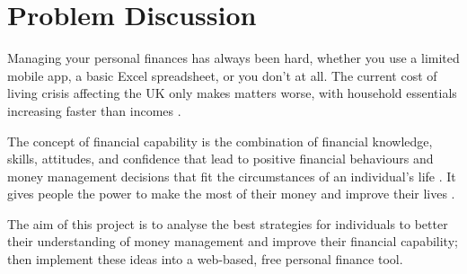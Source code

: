 \section{Problem Discussion}
Managing your personal finances has always been hard, whether you use a limited mobile app, a basic Excel spreadsheet, or you don't at all. The current cost of living crisis affecting the UK only makes matters worse, with household essentials increasing faster than incomes \cite{hourston_2022}.  

The concept of financial capability is the combination of financial knowledge, skills, attitudes, and confidence that lead to positive financial behaviours and money management decisions that fit the circumstances of an individual's life \cite{FinancialCapabilityAU}. It gives people the power to make the most of their money and improve their lives \cite{FinancialCapabilityUK}.

The aim of this project is to analyse the best strategies for individuals to better their understanding of money management and improve their financial capability; then implement these ideas into a web-based, free personal finance tool.
